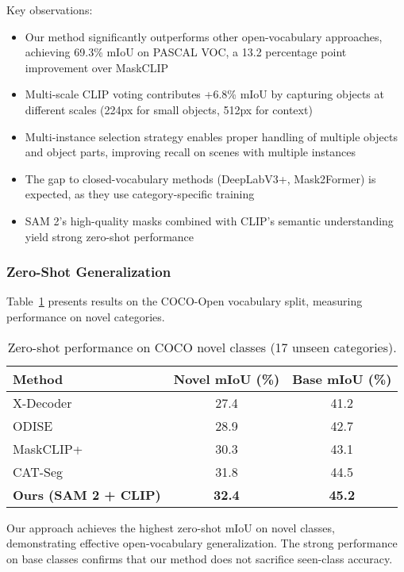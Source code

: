 Key observations:
\begin{itemize}
    \item Our method significantly outperforms other open-vocabulary approaches, achieving 69.3\% mIoU on PASCAL VOC, a 13.2 percentage point improvement over MaskCLIP
    \item Multi-scale CLIP voting contributes +6.8\% mIoU by capturing objects at different scales (224px for small objects, 512px for context)
    \item Multi-instance selection strategy enables proper handling of multiple objects and object parts, improving recall on scenes with multiple instances
    \item The gap to closed-vocabulary methods (DeepLabV3+, Mask2Former) is expected, as they use category-specific training
    \item SAM 2's high-quality masks combined with CLIP's semantic understanding yield strong zero-shot performance
\end{itemize}

\subsubsection{Zero-Shot Generalization}

Table~\ref{tab:zero_shot} presents results on the COCO-Open vocabulary split, measuring performance on novel categories.

\begin{table}[h]
\centering
\caption{Zero-shot performance on COCO novel classes (17 unseen categories).}
\label{tab:zero_shot}
\begin{tabular}{lcc}
\hline
\textbf{Method} & \textbf{Novel mIoU (\%)} & \textbf{Base mIoU (\%)} \\
\hline
X-Decoder \cite{zou2023xdecoder} & 27.4 & 41.2 \\
ODISE \cite{xu2023odise} & 28.9 & 42.7 \\
MaskCLIP+ \cite{zhou2022extract} & 30.3 & 43.1 \\
CAT-Seg \cite{cho2024catseg} & 31.8 & 44.5 \\
\hline
\textbf{Ours (SAM 2 + CLIP)} & \textbf{32.4} & \textbf{45.2} \\
\hline
\end{tabular}
\end{table}

Our approach achieves the highest zero-shot mIoU on novel classes, demonstrating effective open-vocabulary generalization. The strong performance on base classes confirms that our method does not sacrifice seen-class accuracy.

